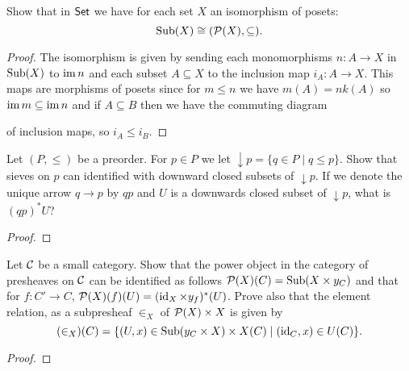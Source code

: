 \begin{exercise}{9.3}
    Show that in $\normalfont\mathsf{Set}$ we have for each set $X$ an isomorphism of posets:
    \[ \operatorname{Sub}(X)\cong(\mathcal{P}(X),\subseteq). \]
\end{exercise}
\begin{solution}
    \begin{proof}
        The isomorphism is given by sending each monomorphisms $n\colon A\to X$ in $\operatorname{Sub}(X)$ to $\operatorname{im} n$ and each subset $A\subseteq X$ to the inclusion map $i_A\colon A\to X$. 
        This maps are morphisms of posets since for $m\leq n$ we have $m(A)=nk(A)$ so $\operatorname{im} m\subseteq\operatorname{im} n$ and if $A\subseteq B$ then we have the commuting diagram 
            of inclusion maps, so $i_A\leq i_B$.
    \end{proof}
\end{solution}

\begin{exercise}{60}
    Let $(P,\leq)$ be a preorder. For $p\in P$ we let $\downarrow p =\{q\in P\mid q\leq p\}$.
    Show that sieves on $p$ can identified with downward closed subsets of $\downarrow p$.
    If we denote the unique arrow $q\to p$ by $qp$ and $U$ is a downwards closed subset of $\downarrow p$, what is $(qp)^*U$?
\end{exercise}
\begin{solution}
    \begin{proof}
        
    \end{proof}
\end{solution}

\begin{exercise}{61}
    Let $\mathcal{C}$ be a small category.
    Show that the power object in the category of presheaves on $\mathcal{C}$ can be identified as follows $\mathcal{P}(X)(C)=\operatorname{Sub}(X\times y_C)$ and that for $f\colon C'\to C$, $\mathcal{P}(X)(f)(U)=(\operatorname{id}_X\times y_f)^*(U)$.
    Prove also that the element relation, as a subpresheaf $\in_X$ of $\mathcal{P}(X)\times X$ is given by
    \[ (\in_X)(C)=\{(U,x)\in\operatorname{Sub}(y_C\times X)\times X(C)\mid(\operatorname{id}_C,x)\in U(C)\}. \]
\end{exercise}
\begin{solution}
    \begin{proof}
        
    \end{proof}
\end{solution}


